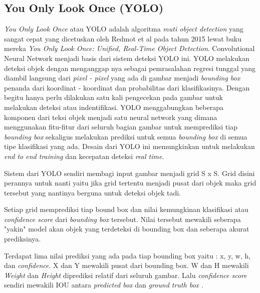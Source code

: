 \subsection{You Only Look Once (YOLO)}
\label{sec:youonlylookone}

\emph{You Only Look Once} atau YOLO adalah algoritma \emph{muti object detection} yang sangat cepat yang dicetuskan oleh Redmot et al pada tahun 2015
lewat buku mereka \emph{You Only Look Once: Unified, Real-Time Object Detection}\cite{redmon2016you}. Convolutional Neural Network menjadi basis dari sistem deteksi YOLO ini.
YOLO melakukan deteksi objek dengan menganggap nya sebagai pemrasalahan regresi tunggal yang diambil langsung dari \emph{pixel - pixel} yang ada
di gambar menjadi \emph{bounding box} penanda dari koordinat - koordinat dan probabilitas dari klasifikasinya. Dengan begitu
hanya perlu dilakukan satu kali pengecekan pada gambar untuk melakukan deteksi atau indentifikasi. \cite{redmon2016you}
YOLO menggabungkan beberapa komponen dari teksi objek menjadi satu neural network yang dimana menggunakan fitu-fitur
dari seluruh bagian gambar untuk memprediksi tiap \emph{bounding box} sekaligus melakukan prediksi untuk semua
\emph{bounding box} di semua tipe klasifikasi yang ada. Desain dari YOLO ini memungkinkan untuk melakukan
\emph{end to end training} dan kecepatan deteksi \emph{real time}.

\par Sistem dari YOLO sendiri membagi input gambar menjadi grid S x S. Grid disini perannya untuk 
nanti yaitu jika grid tertentu menjadi pusat dari objek maka grid tersebut yang nantinya berguna untuk deteksi objek tadi.

\par Setiap grid memprediksi tiap bound box dan nilai kemungkinan klasifikasi atau \emph{confidence score} dari \emph{bounding box} tersebut.
Nilai tersebut mewakili seberapa "yakin" model akan objek yang terdeteksi di bounding box dan seberapa akurat
prediksinya. 

\par Terdapat lima nilai prediksi yang ada pada tiap bounding box yaitu : x, y, w, h, dan \emph{confidence}.
X dan Y mewakili pusat dari bounding box. W dan H mewakili \emph{Weight} dan \emph{Height} diprediksi relatif
dari seluruh gambar. Lalu \emph{confidence score} sendiri mewakili IOU antara \emph{predicted box} dan \emph{ground truth box} \cite{redmon2016you}.